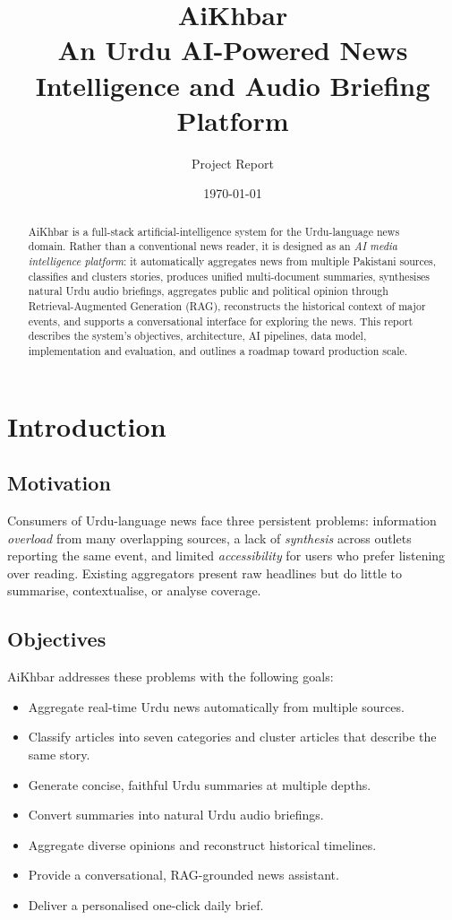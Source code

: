 \documentclass[11pt,a4paper]{article}
\title{\textbf{AiKhbar}\\[0.3em]
\large An Urdu AI-Powered News Intelligence and Audio Briefing Platform}
\author{Project Report}
\date{\today}
\begin{document}
\maketitle
\thispagestyle{fancy}

\begin{abstract}
\noindent
AiKhbar is a full-stack artificial-intelligence system for the Urdu-language
news domain. Rather than a conventional news reader, it is designed as an
\emph{AI media intelligence platform}: it automatically aggregates news from
multiple Pakistani sources, classifies and clusters stories, produces unified
multi-document summaries, synthesises natural Urdu audio briefings, aggregates
public and political opinion through Retrieval-Augmented Generation (RAG),
reconstructs the historical context of major events, and supports a
conversational interface for exploring the news. This report describes the
system's objectives, architecture, AI pipelines, data model, implementation
and evaluation, and outlines a roadmap toward production scale.
\end{abstract}

\tableofcontents
\newpage

\section{Introduction}

\subsection{Motivation}
Consumers of Urdu-language news face three persistent problems: information
\emph{overload} from many overlapping sources, a lack of \emph{synthesis}
across outlets reporting the same event, and limited \emph{accessibility} for
users who prefer listening over reading. Existing aggregators present raw
headlines but do little to summarise, contextualise, or analyse coverage.

\subsection{Objectives}
AiKhbar addresses these problems with the following goals:
\begin{itemize}[noitemsep]
  \item Aggregate real-time Urdu news automatically from multiple sources.
  \item Classify articles into seven categories and cluster articles that
        describe the same story.
  \item Generate concise, faithful Urdu summaries at multiple depths.
  \item Convert summaries into natural Urdu audio briefings.
  \item Aggregate diverse opinions and reconstruct historical timelines.
  \item Provide a conversational, RAG-grounded news assistant.
  \item Deliver a personalised one-click daily brief.
\end{itemize}
\end{document}
